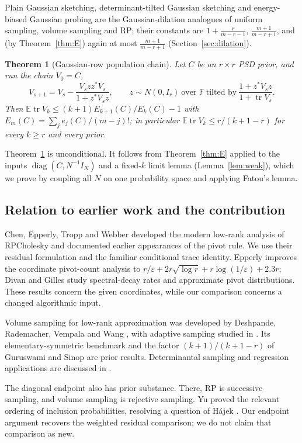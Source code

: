 \documentclass[11pt,a4paper]{article}
\newtheorem{mainthm}{Theorem}
\theoremstyle{definition}
\newcommand{\E}{\mathbb{E}}
\newcommand{\F}{\mathbb{F}}
\newcommand{\tr}{\operatorname{tr}}
\newcommand{\diag}{\operatorname{diag}}
\begin{document}
Plain Gaussian sketching, determinant-tilted Gaussian sketching and energy-biased Gaussian probing are the Gaussian-dilation analogues of uniform sampling, volume sampling and RP; their constants are $1+\frac{r}{m-r-1}$, $\frac{m+1}{m-r+1}$, and (by Theorem~\ref{thm:E}) again at most $\frac{m+1}{m-r+1}$ (Section~\ref{sec:dilation}).

\begin{mainthm}[Gaussian-row population chain]\label{thm:F}
Let $C$ be an $r\times r$ PSD prior, and run the chain $V_0=C$,
\[
V_{s+1}=V_s-\frac{V_sz z^*V_s}{1+z^*V_sz},\qquad z\sim N(0,I_r)\ \text{over }\F\ \text{tilted by}\ \frac{1+z^*V_sz}{1+\tr V_s}.
\]
Then $\E\tr V_k\le(k+1)E_{k+1}(C)/E_k(C)-1$ with $E_m(C)=\sum_{j}e_j(C)/(m-j)!$; in particular $\E\tr V_k\le r/(k+1-r)$ for every $k\ge r$ and every prior.
\end{mainthm}

Theorem~\ref{thm:F} is unconditional. It follows from Theorem~\ref{thm:E} applied to the inputs $\diag(C,N^{-1}I_N)$ and a fixed-$k$ limit lemma (Lemma~\ref{lem:weak}), which we prove by coupling all $N$ on one probability space and applying Fatou's lemma.

\subsection{Relation to earlier work and the contribution}

Chen, Epperly, Tropp and Webber \cite{CETW} developed the modern low-rank analysis of RPCholesky and documented earlier appearances of the pivot rule. We use their residual formulation and the familiar conditional trace identity. Epperly \cite[Cor.~1.3]{Epperly2026} improves the coordinate pivot-count analysis to $r/\varepsilon+2r\sqrt{\log r}+r\log(1/\varepsilon)+2.3r$; Divan and Gilles \cite{DG} study spectral-decay rates and approximate pivot distributions. These results concern the given coordinates, while our comparison concerns a changed algorithmic input.

Volume sampling for low-rank approximation was developed by Deshpande, Rademacher, Vempala and Wang \cite{DRVW}, with adaptive sampling studied in \cite{DV}. Its elementary-symmetric benchmark and the factor $(k+1)/(k+1-r)$ of Guruswami and Sinop \cite{GS} are prior results. Determinantal sampling and regression applications are discussed in \cite{BW,KT,DW,DWH}.

The diagonal endpoint also has prior substance. There, RP is successive sampling, and volume sampling is rejective sampling. Yu \cite{Yu} proved the relevant ordering of inclusion probabilities, resolving a question of H\'ajek \cite{Hajek}. Our endpoint argument recovers the weighted residual comparison; we do not claim that comparison as new.
\end{document}
